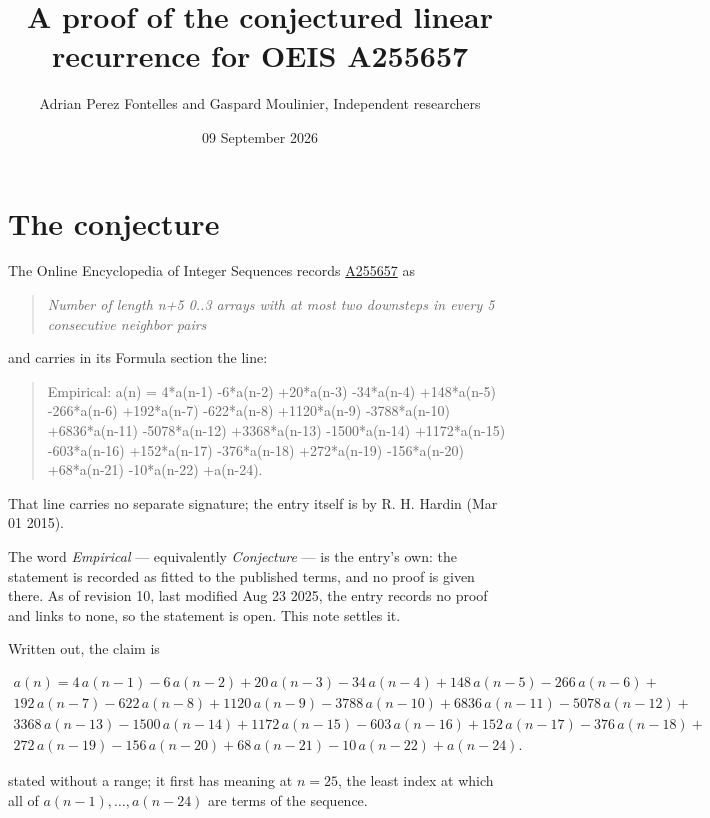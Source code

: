 \documentclass[11pt]{article}
\title{A proof of the conjectured linear recurrence for OEIS A255657}
\author{Adrian Perez Fontelles and Gaspard Moulinier, Independent researchers}
\date{09 September 2026}
\theoremstyle{definition}
\begin{document}
\maketitle
\section{The conjecture}

The Online Encyclopedia of Integer Sequences records \href{https://oeis.org/A255657}{A255657} as

\begin{quote}\itshape Number of length n+5 0..3 arrays with at most two downsteps in every 5 consecutive neighbor pairs\end{quote}

and carries in its Formula section the line:

\begin{quote}\ttfamily Empirical: a(n) = 4*a(n-1) -6*a(n-2) +20*a(n-3) -34*a(n-4) +148*a(n-5) -266*a(n-6) +192*a(n-7) -622*a(n-8) +1120*a(n-9) -3788*a(n-10) +6836*a(n-11) -5078*a(n-12) +3368*a(n-13) -1500*a(n-14) +1172*a(n-15) -603*a(n-16) +152*a(n-17) -376*a(n-18) +272*a(n-19) -156*a(n-20) +68*a(n-21) -10*a(n-22) +a(n-24).\end{quote}

That line carries no separate signature; the entry itself is by R. H. Hardin (Mar 01 2015).

The word {\itshape Empirical} --- equivalently {\itshape Conjecture} --- is the entry's own: the statement is recorded as fitted to the published terms, and no proof is given there. As of revision 10, last modified Aug 23 2025, the entry records no proof and links to none, so the statement is open. This note settles it.

Written out, the claim is

\begin{multline*} a(n) = 4\,a(n-1) - 6\,a(n-2) + 20\,a(n-3) - 34\,a(n-4) + 148\,a(n-5) - 266\,a(n-6) + \\ 192\,a(n-7) - 622\,a(n-8) + 1120\,a(n-9) - 3788\,a(n-10) + 6836\,a(n-11) - 5078\,a(n-12) + \\ 3368\,a(n-13) - 1500\,a(n-14) + 1172\,a(n-15) - 603\,a(n-16) + 152\,a(n-17) - 376\,a(n-18) + \\ 272\,a(n-19) - 156\,a(n-20) + 68\,a(n-21) - 10\,a(n-22) + a(n-24). \end{multline*}

stated without a range; it first has meaning at $n = 25$, the least index at which all of $a(n-1),\dots,a(n-24)$ are terms of the sequence.
\end{document}
